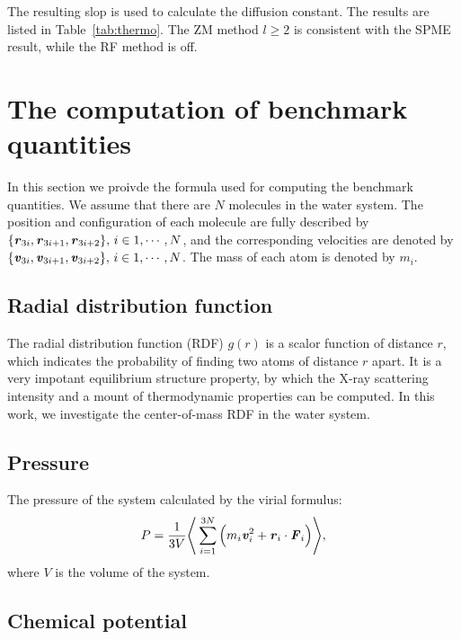 \documentclass[aip,jcp,a4paper,preprint,unsortedaddress,onecolumn,fleqn]{revtex4-1}
\newcommand{\vect}[1]{\textbf{\textit{#1}}}
\begin{document}
The
resulting slop is used to calculate the diffusion constant. The results are listed in Table~\ref{tab:thermo}.
The ZM method $l\geq 2$ is consistent with the SPME
result, while the RF method is off. 

\appendix

\section{The computation of benchmark quantities}
\label{appendix:benchmark}

In this section we proivde the formula used for computing the benchmark quantities. We assume that there are
$N$ molecules in the water system. The position and configuration of each molecule are fully described
by $\{\vect r_{3i},\vect r_{3i+1}, \vect r_{3i+2}\},\, i\in 1,\cdots,N$, and the corresponding velocities
are denoted by $\{\vect v_{3i},\vect v_{3i+1}, \vect v_{3i+2}\},\, i\in 1,\cdots,N$. The mass of each
atom is denoted by $m_i$.

\subsection{Radial distribution function}
The radial distribution function (RDF) $g(r)$ is a scalor function of distance $r$, which indicates the
probability of finding two atoms of distance $r$ apart.  It is a very
impotant equilibrium structure property, by which the X-ray scattering
intensity and a mount of thermodynamic properties can be computed.
In this work, we investigate the center-of-mass RDF in the water
system.


\subsection{Pressure}
The pressure of the system calculated by the virial formulus:
\begin{align}
  P = \frac1{3V}
  \Bigg\langle
  \sum_{i=1}^{3N} \Big( m_i\vect v_i^2 + \vect r_i\cdot \vect F_i \Big)
  \Bigg\rangle,
\end{align}
where $V$ is the volume of the system.

\subsection{Chemical potential}
\end{document}
